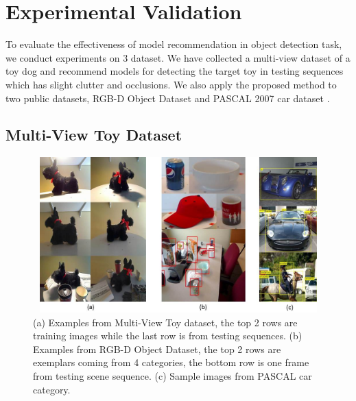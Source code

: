 \documentclass{article} %
\begin{document}
\section{Experimental Validation}
\label{evaluation}
To evaluate the effectiveness of model recommendation in object detection task, we conduct experiments on 3 dataset. We have collected a multi-view dataset of a toy dog and recommend models for detecting the target toy in testing sequences which has slight clutter and occlusions. We also apply the proposed method to two public datasets, RGB-D Object Dataset and PASCAL 2007 car dataset \cite{lai2011large,pascal-voc-2007}.
\subsection{Multi-View Toy Dataset}
\begin{figure}
\begin{center}
\includegraphics[width=14cm,height=6cm]{fig/figure2total.jpg}
\end{center}
\caption{(a) Examples from Multi-View Toy dataset, the top 2 rows are training images while the last row is from testing sequences. (b) Examples from RGB-D Object Dataset, the top 2 rows are exemplars coming from 4 categories, the bottom row is one frame from testing scene sequence. (c) Sample images from PASCAL car category.}
\label{exampleimages}
\end{figure}
\end{document}
